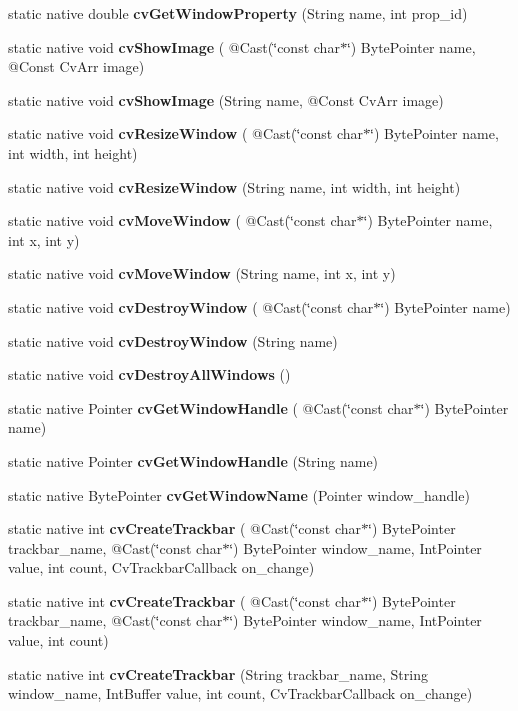 \begin{DoxyCompactItemize}
\item 
static native double {\bfseries cv\+Get\+Window\+Property} (String name, int prop\+\_\+id)
\item 
static native void {\bfseries cv\+Show\+Image} ( @Cast(\char`\"{}const char$\ast$\char`\"{}) Byte\+Pointer name, @Const Cv\+Arr image)
\item 
static native void {\bfseries cv\+Show\+Image} (String name, @Const Cv\+Arr image)
\item 
static native void {\bfseries cv\+Resize\+Window} ( @Cast(\char`\"{}const char$\ast$\char`\"{}) Byte\+Pointer name, int width, int height)
\item 
static native void {\bfseries cv\+Resize\+Window} (String name, int width, int height)
\item 
static native void {\bfseries cv\+Move\+Window} ( @Cast(\char`\"{}const char$\ast$\char`\"{}) Byte\+Pointer name, int x, int y)
\item 
static native void {\bfseries cv\+Move\+Window} (String name, int x, int y)
\item 
static native void {\bfseries cv\+Destroy\+Window} ( @Cast(\char`\"{}const char$\ast$\char`\"{}) Byte\+Pointer name)
\item 
static native void {\bfseries cv\+Destroy\+Window} (String name)
\item 
static native void {\bfseries cv\+Destroy\+All\+Windows} ()
\item 
static native Pointer {\bfseries cv\+Get\+Window\+Handle} ( @Cast(\char`\"{}const char$\ast$\char`\"{}) Byte\+Pointer name)
\item 
static native Pointer {\bfseries cv\+Get\+Window\+Handle} (String name)
\item 
static native Byte\+Pointer {\bfseries cv\+Get\+Window\+Name} (Pointer window\+\_\+handle)
\item 
static native int {\bfseries cv\+Create\+Trackbar} ( @Cast(\char`\"{}const char$\ast$\char`\"{}) Byte\+Pointer trackbar\+\_\+name, @Cast(\char`\"{}const char$\ast$\char`\"{}) Byte\+Pointer window\+\_\+name, Int\+Pointer value, int count, Cv\+Trackbar\+Callback on\+\_\+change)
\item 
static native int {\bfseries cv\+Create\+Trackbar} ( @Cast(\char`\"{}const char$\ast$\char`\"{}) Byte\+Pointer trackbar\+\_\+name, @Cast(\char`\"{}const char$\ast$\char`\"{}) Byte\+Pointer window\+\_\+name, Int\+Pointer value, int count)
\item 
static native int {\bfseries cv\+Create\+Trackbar} (String trackbar\+\_\+name, String window\+\_\+name, Int\+Buffer value, int count, Cv\+Trackbar\+Callback on\+\_\+change)

\end{DoxyCompactItemize}
